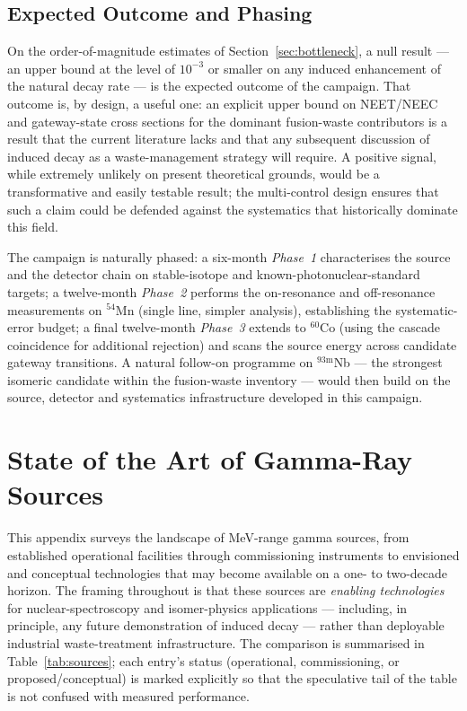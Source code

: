 \documentclass[conference]{IEEEtran}
\begin{document}
\subsection{Expected Outcome and Phasing}
On the order-of-magnitude estimates of Section~\ref{sec:bottleneck}, a null result --- an upper bound at the level of $10^{-3}$ or smaller on any induced enhancement of the natural decay rate --- is the expected outcome of the campaign. That outcome is, by design, a useful one: an explicit upper bound on NEET/NEEC and gateway-state cross sections for the dominant fusion-waste contributors is a result that the current literature lacks and that any subsequent discussion of induced decay as a waste-management strategy will require. A positive signal, while extremely unlikely on present theoretical grounds, would be a transformative and easily testable result; the multi-control design ensures that such a claim could be defended against the systematics that historically dominate this field.

The campaign is naturally phased: a six-month \emph{Phase~1} characterises the source and the detector chain on stable-isotope and known-photonuclear-standard targets; a twelve-month \emph{Phase~2} performs the on-resonance and off-resonance measurements on $^{54}$Mn (single line, simpler analysis), establishing the systematic-error budget; a final twelve-month \emph{Phase~3} extends to $^{60}$Co (using the cascade coincidence for additional rejection) and scans the source energy across candidate gateway transitions. A natural follow-on programme on $^{93\mathrm{m}}$Nb --- the strongest isomeric candidate within the fusion-waste inventory --- would then build on the source, detector and systematics infrastructure developed in this campaign.

\section{State of the Art of Gamma-Ray Sources}
\label{app:sources}

This appendix surveys the landscape of MeV-range gamma sources, from established operational facilities through commissioning instruments to envisioned and conceptual technologies that may become available on a one- to two-decade horizon. The framing throughout is that these sources are \emph{enabling technologies} for nuclear-spectroscopy and isomer-physics applications --- including, in principle, any future demonstration of induced decay --- rather than deployable industrial waste-treatment infrastructure. The comparison is summarised in Table~\ref{tab:sources}; each entry's status (operational, commissioning, or proposed/conceptual) is marked explicitly so that the speculative tail of the table is not confused with measured performance.
\end{document}
